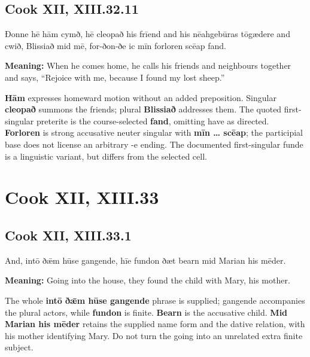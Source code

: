 \par\begin{minipage}{\linewidth}\raggedright
\subsection*{Cook XII, XIII.32.11}

Ðonne hē hām cymð, hē cleopað his frīend and his nēahgebūras tōgædere and cwið, Blissiað mid mē, for-ðon-ðe ic mīn forloren scēap fand.

\textbf{Meaning:} When he comes home, he calls his friends and neighbours together and says, “Rejoice with me, because I found my lost sheep.”

\textbf{Hām} expresses homeward motion without an added preposition. Singular \textbf{cleopað} summons the friends; plural \textbf{Blissiað} addresses them. The quoted first-singular preterite is the course-selected \textbf{fand}, omitting have as directed. \textbf{Forloren} is strong accusative neuter singular with \textbf{mīn … scēap}; the participial base does not license an arbitrary -e ending. The documented first-singular funde is a linguistic variant, but differs from the selected cell.

\end{minipage}\par\addvspace{4pt}

\clearpage
\section*{Cook XII, XIII.33}

\par\begin{minipage}{\linewidth}\raggedright
\subsection*{Cook XII, XIII.33.1}

And, intō ðǣm hūse gangende, hīe fundon ðæt bearn mid Marian his mēder.

\textbf{Meaning:} Going into the house, they found the child with Mary, his mother.

The whole \textbf{intō ðǣm hūse gangende} phrase is supplied; gangende accompanies the plural actors, while \textbf{fundon} is finite. \textbf{Bearn} is the accusative child. \textbf{Mid Marian his mēder} retains the supplied name form and the dative relation, with his mother identifying Mary. Do not turn the going into an unrelated extra finite subject.

\end{minipage}\par\addvspace{4pt}

